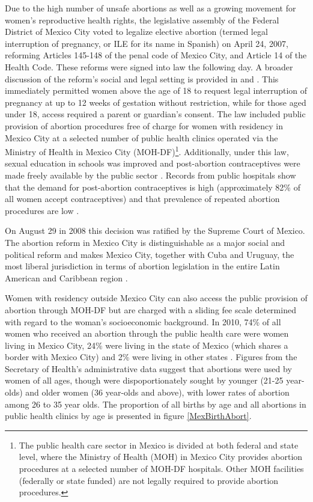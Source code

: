\documentclass[a4paper, 11pt]{article}
\begin{document}
\begin{spacing}{2}
Due to the high number of unsafe abortions as well as a growing movement for women's reproductive health rights, the legislative assembly of the Federal District of Mexico City voted to legalize elective abortion (termed legal interruption of pregnancy, or ILE for its name in Spanish) on April 24, 2007, reforming Articles 145-148 of the penal code of Mexico City, and Article 14 of the Health Code.  These reforms were signed into law the following day.  A broader discussion of the reform's social and legal setting is provided in \citet{Kulczycki2011, Madrazo2009} and \citet{Johnson2013}.  This immediately permitted women above the age of 18 to request legal interruption of pregnancy at up to 12 weeks of gestation without restriction, while for those aged under 18, access required a parent or guardian's consent. The law included public provision of abortion procedures free of charge for women with residency in Mexico City at a selected number of public health clinics operated via the Ministry of Health in Mexico City (MOH-DF)\footnote{The public health care sector in Mexico is divided at both federal and state level, where the Ministry of Health (MOH) in Mexico City provides abortion procedures at a selected number of MOH-DF hospitals. Other MOH facilities (federally or state funded) are not legally required to provide abortion procedures.}.  Additionally, under this law, sexual education in schools was improved and post-abortion contraceptives were made freely available by the public sector \citep{Contreras2011}. Records from public hospitals show that the demand for post-abortion contraceptives is high (approximately 82\% of all women accept contraceptives) and that prevalence of repeated abortion procedures are low \citep{Becker2013}.

On August 29 in 2008 this decision was ratified by the Supreme Court of Mexico. The abortion reform in Mexico City is distinguishable as a major social and political reform and makes Mexico City, together with Cuba and Uruguay, the most liberal jurisdiction in terms of abortion legislation in the entire Latin American and Caribbean region \citep{Fraser2015}.

Women with residency outside Mexico City can also access the public provision of abortion through MOH-DF but are charged with a sliding fee scale determined with regard to the woman's socioeconomic background. In 2010, 74\% of all women who received an abortion through the public health care were women living in Mexico City, 24\% were living in the state of Mexico (which shares a border with Mexico City) and 2\% were living in other states \citep{Kalb}.  Figures from the Secretary of Health's administrative data suggest that abortions were used by women of all ages, though were dispoportionately sought by younger (21-25 year-olds) and older women (36 year-olds and above), with lower rates of abortion among 26 to 35 year olds.  The proportion of all births by age and all abortions in public health clinics by age is presented in figure \ref{MexBirthAbort}.


\end{spacing}
\end{document}

